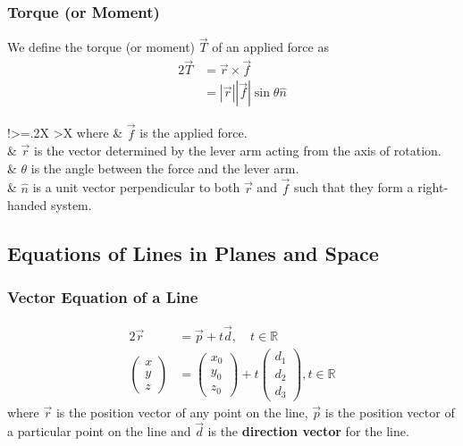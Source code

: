 \documentclass[letterpaper, 12pt]{report}
\newcommand\R{\mathbb{R}}
\theoremstyle{definition}
\numberwithin{equation}{section}
\begin{document}
\subsubsection*{Torque (or Moment)}
We define the torque (or moment) $\vec T$ of an applied force as
\begin{alignat}{2}
	\vec T &= \vec r \times \vec f \\
				 &= |\vec r||\vec f| \sin \theta \hat n
\end{alignat}
\begin{tabularx}{\textwidth}{!{\extracolsep{\fill}}>{\hsize=.2\hsize}X >{\hsize}X}
	where & $\vec f$ is the applied force. \\
				& $\vec r$ is the vector determined by the lever arm acting from the axis of rotation. \\
				& $\theta$ is the angle between the force and the lever arm. \\
				& $\hat n$ is a unit vector perpendicular to both $\vec r$ and $\vec f$ such that they form a right-handed system.
\end{tabularx}

\subsection{Equations of Lines in Planes and Space}

\subsubsection{Vector Equation of a Line}
\begin{alignat}{2}
	\vec r &= \vec p + t \vec d, \quad t \in \R 
	\\
	\begin{pmatrix}
		x \\ y \\ z
	\end{pmatrix} 
	&= 
	\begin{pmatrix}
		x_0 \\ y_0 \\ z_0
	\end{pmatrix}
	+ t
	\begin{pmatrix}
		d_1 \\ d_2 \\ d_3
	\end{pmatrix}
	, t \in \R
\end{alignat}
where $\vec r$ is the position vector of any point on the line, $\vec p$ is the position vector of a particular point on the line and $\vec d$ is the \textbf{direction vector} for the line.
\end{document}
